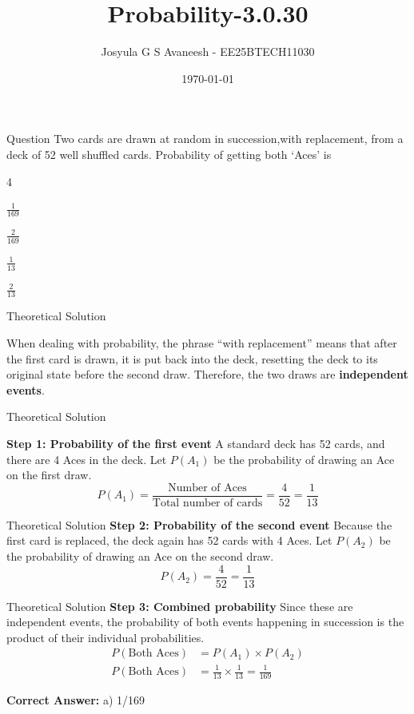 \documentclass{beamer}
\title %
{Probability-3.0.30}
\date{\today}
\author 
{Josyula G S Avaneesh - EE25BTECH11030}
\begin{document}
\frame{\titlepage}
\begin{frame}{Question}
Two cards are drawn at random in succession,with replacement, from a deck of 52 well shuffled cards. Probability of getting both ‘Aces’ is
\begin{enumerate}
\begin{multicols}{4}
    \item $\frac{1}{169}$
    \item $\frac{2}{169}$
    \item $\frac{1}{13}$
    \item $\frac{2}{13}$
\end{multicols}
\end{enumerate}
\end{frame}


\begin{frame}{Theoretical Solution}

When dealing with probability, the phrase ``with replacement'' means that after the first card is drawn, it is put back into the deck, resetting the deck to its original state before the second draw. Therefore, the two draws are \textbf{independent events}.
\end{frame}

\begin{frame}{Theoretical Solution}

\textbf{Step 1: Probability of the first event}
A standard deck has 52 cards, and there are 4 Aces in the deck. Let $P(A_1)$ be the probability of drawing an Ace on the first draw.
\[
P(A_1) = \frac{\text{Number of Aces}}{\text{Total number of cards}} = \frac{4}{52} = \frac{1}{13}
\]

\end{frame}


\begin{frame}{Theoretical Solution} 
\textbf{Step 2: Probability of the second event}
Because the first card is replaced, the deck again has 52 cards with 4 Aces. Let $P(A_2)$ be the probability of drawing an Ace on the second draw.
\[
P(A_2) = \frac{4}{52} = \frac{1}{13}
\]
\end{frame}

\begin{frame}{Theoretical Solution}
\textbf{Step 3: Combined probability}
Since these are independent events, the probability of both events happening in succession is the product of their individual probabilities.
\begin{align*}
P(\text{Both Aces}) &= P(A_1) \times P(A_2) \\
P(\text{Both Aces}) &= \frac{1}{13} \times \frac{1}{13} = \frac{1}{169}
\end{align*}

\vspace{0.5cm}
\noindent \textbf{Correct Answer:} a) 1/169

\end{frame}
\end{document}
